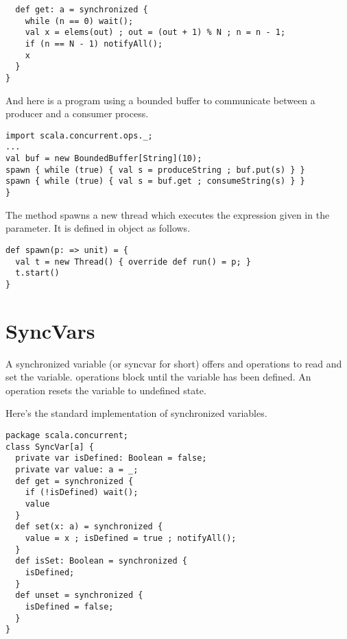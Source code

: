 {\begin{lstlisting}
  def get: a = synchronized {
    while (n == 0) wait();
    val x = elems(out) ; out = (out + 1) % N ; n = n - 1;
    if (n == N - 1) notifyAll();
    x
  }
}
\end{lstlisting}
And here is a program using a bounded buffer to communicate between a
producer and a consumer process.
\begin{lstlisting}
import scala.concurrent.ops._;
...
val buf = new BoundedBuffer[String](10);
spawn { while (true) { val s = produceString ; buf.put(s) } }
spawn { while (true) { val s = buf.get ; consumeString(s) } }
}
\end{lstlisting}
The  method spawns a new thread which executes the
expression given in the parameter. It is defined in object 
as follows.
\begin{lstlisting}
def spawn(p: => unit) = {
  val t = new Thread() { override def run() = p; }
  t.start()
}
\end{lstlisting}


\section{SyncVars}

A synchronized variable (or syncvar for short) offers  and
 operations to read and set the variable.  operations
block until the variable has been defined. An  operation
resets the variable to undefined state.

Here's the standard implementation of synchronized variables.
\begin{lstlisting}
package scala.concurrent;
class SyncVar[a] {
  private var isDefined: Boolean = false;
  private var value: a = _;
  def get = synchronized {
    if (!isDefined) wait();
    value
  }
  def set(x: a) = synchronized {
    value = x ; isDefined = true ; notifyAll();
  }
  def isSet: Boolean = synchronized {
    isDefined;
  }
  def unset = synchronized { 
    isDefined = false; 
  }
}
\end{lstlisting}

}
